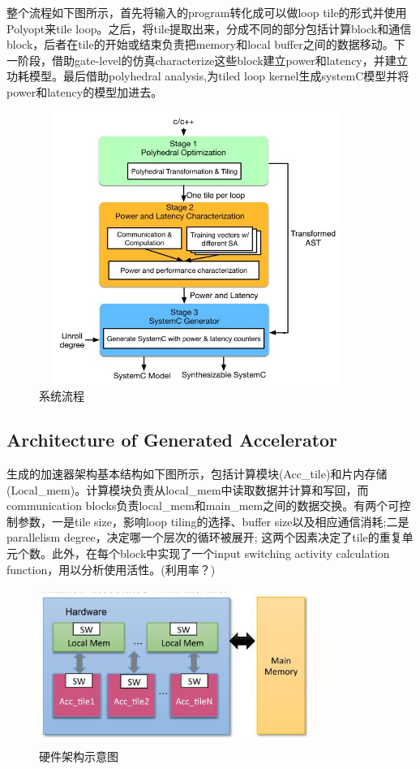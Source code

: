 \documentclass[UTF8]{scrartcl}
\begin{document}
		整个流程如下图所示，首先将输入的program转化成可以做loop tile的形式并使用Polyopt来tile loop。之后，将tile提取出来，分成不同的部分包括计算block和通信block，后者在tile的开始或结束负责把memory和local buffer之间的数据移动。下一阶段，借助gate-level的仿真characterize这些block建立power和latency，并建立功耗模型。最后借助polyhedral analysis,为tiled loop kernel生成systemC模型并将power和latency的模型加进去。
		
			\begin{figure}[h]
				\centering
				\includegraphics[width=4.00in,height=3.50in]{system.jpg} 
				\caption{系统流程}
				\label{fig1}
			\end{figure}

	\subsection{Architecture of Generated Accelerator}
		
		生成的加速器架构基本结构如下图所示，包括计算模块(Acc\_tile)和片内存储(Local\_mem)。计算模块负责从local\_mem中读取数据并计算和写回，而communication blocks负责local\_mem和main\_mem之间的数据交换。有两个可控制参数，一是tile size，影响loop tiling的选择、buffer size以及相应通信消耗;二是parallelism degree，决定哪一个层次的循环被展开; 这两个因素决定了tile的重复单元个数。此外，在每个block中实现了一个input switching activity calculation function，用以分析使用活性。(利用率？)
		
		\begin{figure}[h]
			\centering
			\includegraphics[width=3.50in,height=2.00in]{hardware.jpg} 
			\caption{硬件架构示意图}
			\label{fig2}
		 \end{figure}
		
\end{document}
